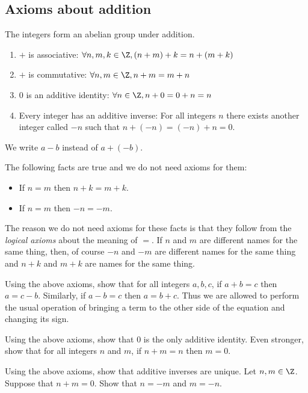 \documentclass[oneside,12pt]{amsart}
\begin{document}
\subsection{Axioms about addition}
The integers form an abelian group under addition.

\begin{enumerate}
\item $+$ is associative: $\forall n,m,k\in\Z, (n+m)+k=n+(m+k)$
\item $+$ is commutative: $\forall n,m\in\Z, n+m=m+n$
\item 0 is an additive identity: $\forall n\in\Z, n+0 = 0+n = n$
\item Every integer has an additive inverse: For all integers $n$ there exists another
integer called $-n$ such that $n + (-n) = (-n) + n = 0$.
\end{enumerate}

We write $a-b$ instead of $a + (-b)$.

\begin{remark}
The following facts are true and we do not need axioms for them:
\begin{itemize}
\item If $n=m$ then $n+k = m+k$.
\item If $n=m$ then $-n = -m$.
\end{itemize}
The reason we do not need axioms for these facts is that they follow from
the \emph{logical axioms} about the meaning of $=$. If $n$ and $m$ are different
names for the same thing, then, of course $-n$ and $-m$ are different names
for the same thing and $n+k$ and $m+k$ are names for the same thing.
\end{remark}

\begin{homework}
Using the above axioms, show that for all integers $a,b,c$, if
$a+b = c$ then $a = c - b$. Similarly, if $a-b=c$ then $a=b+c$.
Thus we are allowed to perform the usual operation of bringing a
term to the other side of the equation and changing its sign.
\end{homework}

\begin{homework}
\label{ZeroIsUnique}
Using the above axioms, show that $0$ is the only additive identity.  Even
stronger, show that for all integers $n$ and $m$, if $n+m=n$ then $m=0$.
\end{homework}

\begin{homework}
Using the above axioms, show that additive inverses are unique. Let $n,m\in\Z$.
Suppose that $n+m = 0$. Show that $n=-m$ and $m=-n$.
\end{homework}
\end{document}
